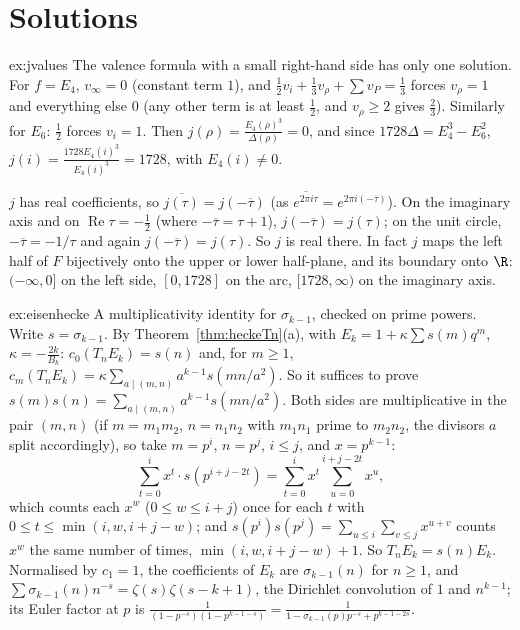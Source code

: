 \section{Solutions}

\begin{solution}{ex:jvalues}
\idea The valence formula with a small right-hand side has only one solution.
\writeup For $f=E_4$, $v_\infty=0$ (constant term $1$), and $\frac12v_i+\frac13v_\rho+\sum v_P=\frac13$ forces $v_\rho=1$ and everything else $0$ (any other term is at least
$\frac12$, and $v_\rho\ge2$ gives $\frac23$). Similarly for $E_6$: $\frac12$ forces $v_i=1$. Then $j(\rho)=\frac{E_4(\rho)^3}{\Delta(\rho)}=0$, and since
$1728\Delta=E_4^3-E_6^2$, $j(i)=\frac{1728E_4(i)^3}{E_4(i)^3}=1728$, with $E_4(i)\ne0$.

$j$ has real coefficients, so $\overline{j(\tau)}=j(-\overline\tau)$ (as $\overline{e^{2\pi i\tau}}=e^{2\pi i(-\overline\tau)}$). On the imaginary axis and on
$\operatorname{Re}\tau=-\frac12$ (where $-\overline\tau=\tau+1$), $j(-\overline\tau)=j(\tau)$; on the unit circle, $-\overline\tau=-1/\tau$ and again $j(-\overline\tau)=j(\tau)$. So $j$ is real
there. In fact $j$ maps the left half of $F$ bijectively onto the upper or lower half-plane, and its boundary onto $\R$: $(-\infty,0]$ on the left side, $[0,1728]$ on the
arc, $[1728,\infty)$ on the imaginary axis.
\end{solution}

\begin{solution}{ex:eisenhecke}
\idea A multiplicativity identity for $\sigma_{k-1}$, checked on prime powers.
\writeup Write $s=\sigma_{k-1}$. By Theorem~\ref{thm:heckeTn}(a), with $E_k=1+\kappa\sum s(m)q^m$, $\kappa=-\frac{2k}{B_k}$: $c_0(T_nE_k)=s(n)$ and, for $m\ge1$,
$c_m(T_nE_k)=\kappa\sum_{a\mid(m,n)}a^{k-1}s(mn/a^2)$. So it suffices to prove $s(m)s(n)=\sum_{a\mid(m,n)}a^{k-1}s(mn/a^2)$. Both sides are multiplicative in the pair
$(m,n)$ (if $m=m_1m_2$, $n=n_1n_2$ with $m_1n_1$ prime to $m_2n_2$, the divisors $a$ split accordingly), so take $m=p^i$, $n=p^j$, $i\le j$, and $x=p^{k-1}$:
\[
\sum_{t=0}^ix^t\cdot s(p^{i+j-2t})=\sum_{t=0}^ix^t\sum_{u=0}^{i+j-2t}x^u ,
\]
which counts each $x^w$ ($0\le w\le i+j$) once for each $t$ with $0\le t\le\min(i,w,i+j-w)$; and $s(p^i)s(p^j)=\sum_{u\le i}\sum_{v\le j}x^{u+v}$ counts $x^w$ the same number of
times, $\min(i,w,i+j-w)+1$. So $T_nE_k=s(n)E_k$. Normalised by $c_1=1$, the coefficients of $E_k$ are $\sigma_{k-1}(n)$ for $n\ge1$, and
$\sum\sigma_{k-1}(n)n^{-s}=\zeta(s)\zeta(s-k+1)$, the Dirichlet convolution of $1$ and $n^{k-1}$; its Euler factor at $p$ is
$\frac1{(1-p^{-s})(1-p^{k-1-s})}=\frac1{1-\sigma_{k-1}(p)p^{-s}+p^{k-1-2s}}$.
\end{solution}

